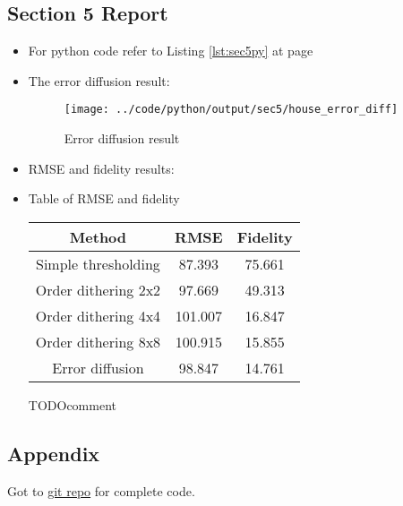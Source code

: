 \documentclass[a4paper,11pt]{article}
\newcommand{\reflst}[1]{Listing \ref{#1} at page \pageref{#1}}
\newcommand{\TODO}{{\color{red}TODO}}
\begin{document}
\subsection*{Section 5 Report} 
\begin{itemize}
 \item For python code refer to \reflst{lst:sec5py}
 \item The error diffusion result:
 \begin{figure}[!hp]
  \centering
  \texttt{[image: ../code/python/output/sec5/house\_error\_diff]}
  \caption{Error diffusion result}
 \end{figure}
 \item RMSE and fidelity results:
  
\item Table of RMSE and fidelity
\begin{table}[!h]
    \centering
    \begin{tabular}{|c|c|c|}
    \hline
    Method& RMSE& Fidelity\\
    \hline
    Simple thresholding& 87.393& 75.661\\
    \hline
    Order dithering 2x2& 97.669& 49.313\\
    \hline
    Order dithering 4x4& 101.007& 16.847\\
    \hline
    Order dithering 8x8& 100.915& 15.855\\
    \hline
    Error diffusion& 98.847& 14.761\\
    \hline
    \end{tabular}
\end{table}

\TODO comment
\end{itemize}


\clearpage
\subsection*{Appendix}
Got to \href{https://github.com/rahuldeshmukh43/Courses/tree/master/ECE637-DigitalImageProcessing-I/labs/lab8/code/}{git repo} for complete code.






\end{document}

